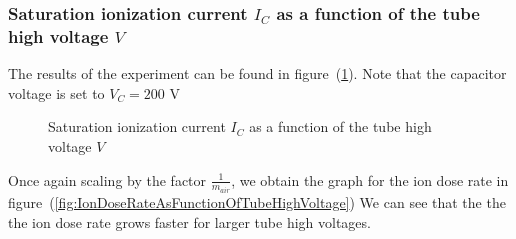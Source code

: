 \documentclass{scrartcl}
\begin{document}
\subsubsection{Saturation ionization current $I_C$ as a function of the tube high voltage $V$}

\noindent The results of the experiment can be found in figure~(\ref{fig:SaturationIonizationCurrentAsFunctionOfTubeHighVoltage}). Note that the capacitor voltage is set to $V_C = 200$ V

\begin{figure}[!ht]
    \centering
    \caption{Saturation ionization current $I_C$ as a function of the tube high voltage $V$}
    \label{fig:SaturationIonizationCurrentAsFunctionOfTubeHighVoltage}
\end{figure}
\FloatBarrier

\noindent Once again scaling by the factor $\frac{1}{m_{air}}$, we obtain the graph for the ion dose rate in figure~(\ref{fig:IonDoseRateAsFunctionOfTubeHighVoltage}) We can see that the the the ion dose rate grows faster for larger tube high voltages.
\end{document}
